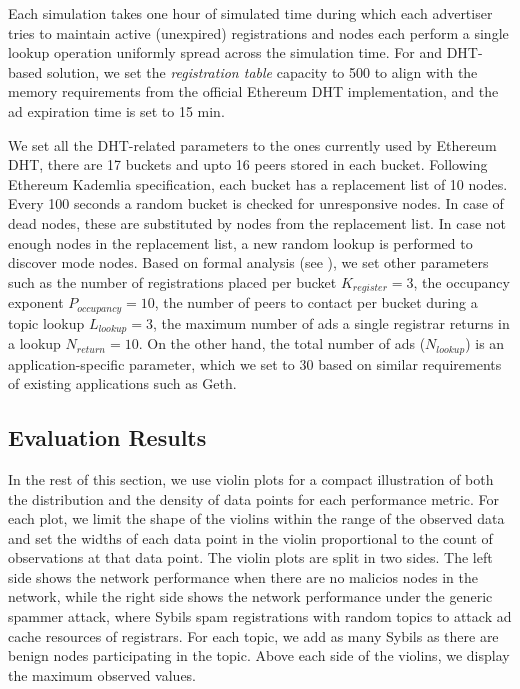  
Each simulation takes one hour of simulated time during which each advertiser tries to maintain active (\ie unexpired) registrations and nodes each perform a single lookup operation uniformly spread across the simulation time.  For \sysname and DHT-based solution, we set the \emph{registration table} capacity to 500 to align with the memory requirements from the official Ethereum DHT implementation, and the ad expiration time is set to 15 min. %

We set all the DHT-related parameters to the ones currently used by Ethereum DHT, \ie there are 17 buckets and upto 16 peers stored in each bucket.
Following Ethereum Kademlia specification,  each bucket has a replacement list of 10 nodes. 
Every 100 seconds a random bucket is checked for unresponsive nodes. 
In case of dead nodes, these are substituted by nodes from the replacement list.  In case not enough nodes in the replacement list,  a new random lookup is performed to discover mode nodes.
Based on formal analysis (see ), we set other \sysname parameters such as the number of registrations placed per bucket $K_{register}= 3$, the occupancy exponent $P_{occupancy} = 10$, the number of peers to contact per bucket during a topic lookup $L_\textit{lookup}=3$, the maximum number of ads a single registrar returns in a lookup $N_\textit{return}=10$. On the other hand, the total number of ads (\ie $N_\textit{lookup}$) is an application-specific parameter, which we set to 30 based on similar requirements of existing applications such as Geth.


\subsection{Evaluation Results}

In the rest of this section, we use violin plots for a compact illustration of both the distribution and the density of data points for each performance metric. For each plot, we limit the shape of the violins within the range of the observed data and set the widths of each data point in the violin proportional to the count of observations at that data point. 
The violin plots are split in two sides. The left side shows the network performance when there are no malicios nodes in the network, while the right side shows the network performance under the generic spammer attack, where Sybils spam registrations with random topics to attack ad cache resources of registrars. For each topic, we add as many Sybils as there are benign nodes participating in the topic. 
Above each side of the violins, we display the maximum observed values. 

